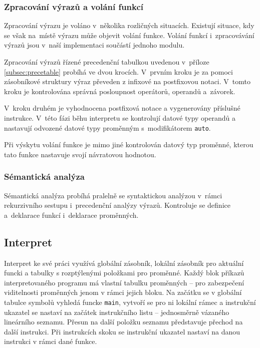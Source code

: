 \documentclass[a4paper, 12pt]{article}
\begin{document}
\subsubsection{Zpracování výrazů a volání funkcí}
Zpracování výrazu je voláno v~několika rozličných situacích. Existují situace,
kdy se však na~místě výrazu může objevit volání funkce. Volání funkcí i~zpracovávání
výrazů jsou v~naší implementaci součástí jednoho modulu.

Zpracování výrazů řízené precedenční tabulkou uvedenou v~příloze
\ref{subsec:precetable} probíhá ve dvou krocích. V~prvním kroku je za pomoci
zásobníkové struktury výraz převeden z infixové
na postfixovou notaci. V~tomto kroku je kontrolována správná posloupnost
operátorů, operandů a~závorek.

V~kroku druhém je vyhodnocena postfixová notace a vygenerovány příslušné instrukce.
V~této fázi běhu interpretu se kontrolují datové typy operandů a nastavují
odvozené datové typy proměnným s~modifikátorem \texttt{auto}.

Při výskytu volání funkce je mimo jiné kontrolován datový typ proměnné,
kterou tato funkce nastavuje svojí návratovou hodnotou.

\subsubsection{Sémantická analýza}
Sémantická analýza probíhá pralelně se syntaktickou analýzou v~rámci
rekurzivního sestupu i~precedenční analýzy výrazů. Kontroluje se definice
a~deklarace funkcí i~deklarace proměnných.

\subsection{Interpret} \label{interpret}
Interpret ke své práci využívá globální zásobník, lokální zásobník pro aktuální
funcki a tabulky s rozptýlenými položkami pro proměnné. Každý blok příkazů
interpretovaného programu má vlastní tabulku proměnných -- pro zabezpečení viditelnosti
proměnných jenom v rámci jejich bloku.
Na začátku se v globální tabulce symbolů vyhledá funcke \texttt{main},
vytvoří se pro ni lokální rámec a instrukční ukazatel se nastaví na začátek
instrukčního listu -- jednosměrně vázaného lineárního seznamu.
Přesun na další položku seznamu představuje přechod na další instrukci.
Při instrukcích skoku se instrukční ukazatel nastaví
na danou instrukci v rámci dané funkce.
\end{document}
